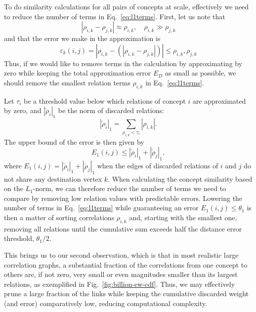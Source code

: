 \documentclass{sig-alternate}
\newcommand{\rn}[1]{\rho_{#1}}
\newcommand{\mrn}[1]{\tau_{#1}}
\newcommand{\drns}[1]{|\check{\rho}_{#1}|_1}
\begin{document}
To do similarity calculations for all pairs of concepts at scale, effectively we need to reduce the number of terms in Eq.\ \ref{eq:l1terms}. First, let us note that
\begin{equation}
\label{eq:corrapprox}
| \rn{i,k} - \rn{j,k} | \approx \rn{i,k}, \quad \rn{i,k} \gg \rn{j,k}
\end{equation}
and that the error we make in the approximation is
\begin{equation}
\label{eq:corrapproxbound}
\varepsilon_k(i, j) = | \rn{i,k} - (| \rn{i,k} - \rn{j,k} | ) | \leq \rn{i,k}, \rn{j,k}
\end{equation}
Thus, if we would like to remove terms in the calculation by approximating by zero while keeping the total approximation error $E_D$ as small as possible, we should remove the smallest relation terms $\rn{i,k}$ in Eq.\ \ref{eq:l1terms}.

Let $\mrn{i}$ be a threshold value below which relations of concept $i$ are approximated by zero, and $\drns{i}$ be the norm of discarded relations:
\begin{equation} \label{}
\drns{i} = \sum_{ \rn{i,k} < \mrn{i}} |\rn{i,k}|.
\end{equation}
The upper bound of the error is then given by
\begin{equation} \label{eq:errbound}
E_1(i,j) \leq \drns{i} + \drns{j},
\end{equation}
where $E_1(i,j)=\drns{i} + \drns{j}$ when the edges of discarded relations of $i$ and $j$ do not share any destination
vertex $k$. When calculating the concept similarity based on the $L_1$-norm, we can therefore reduce the number of
terms we need to compare by removing low relation values with predictable errors. Lowering the number of terms in
Eq.\ \ref{eq:l1terms} while guaranteeing an error $E_1(i,j) \leq \theta_1$ is then a matter of sorting correlations
$\rn{i,k}$ and, starting with the smallest one, removing all relations until the cumulative sum exceeds half the
distance error threshold, $\theta_1/2$.

This brings us to our second observation, which is that in most realistic large correlation graphs, a substantial fraction of
the correlations from one concept to others are, if not zero, very small or even magnitudes smaller than its largest
relations, as exemplified in Fig.\ \ref{fig:billion-ew-cdf}. Thus, we may effectively prune a
large fraction of the links while keeping the cumulative discarded weight (and error) comparatively low, reducing
computational complexity.
\end{document}

